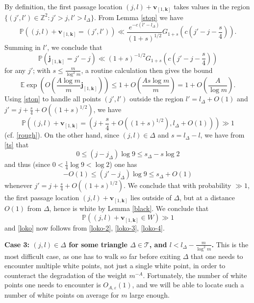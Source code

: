 \documentclass[12pt,a4paper,reqno]{amsart}
\numberwithin{equation}{section}
\theoremstyle{plain}
\theoremstyle{definition}
\renewcommand\P{\mathbb{P}}
\newcommand\E{\mathbb{E}}
\newcommand\Z{\mathbb{Z}}
\renewcommand\j{\mathbf{j}}
\renewcommand\k{\mathbf{k}}
\renewcommand\v{\mathbf{v}}
\newcommand\eps{\varepsilon}
\begin{document}
By definition, the first passage location $(j,l) + \v_{[1,\k]}$ takes values in the region $\{ (j',l') \in \Z^2: j' > j, l' > l_\Delta \}$.  From Lemma \ref{stop} we have
\begin{equation}\label{ston}
\P( (j,l) + \v_{[1,\k]} = (j',l') ) \ll \frac{e^{-c(l'-l_\Delta)}}{(1+s)^{1/2} } G_{1+s}\left(c(j'-j - \frac{s}{4}) \right).
\end{equation}
Summing in $l'$, we conclude that
$$\P( \j_{[1,\k]} = j'-j ) \ll (1+s)^{-1/2} G_{1+s}\left( c(j'-j - \frac{s}{4}) \right)$$
for any $j'$; with $s \leq \frac{m}{\log^2 m}$, a routine calculation then gives the bound
\begin{equation}\label{loko-3}
 \E \exp\left( O\left( \frac{A\log m}{m} \j_{[1,\k]} \right) \right) \leq 1 + O\left( \frac{As \log m}{m} \right) = 1 + O\left( \frac{A}{\log m} \right).
\end{equation}
Using \eqref{ston} to handle all points $(j',l')$ outside the region $l' = l_\Delta+O(1)$ and $j' = j + \frac{s}{4} + O( (1+s)^{1/2} )$, we have
\begin{equation}\label{hash}
 \P\left( (j,l) + \v_{[1,\k]} = \left(j+\frac{s}{4} + O((1+s)^{1/2}),l_\Delta + O(1)\right) \right) \gg 1
\end{equation}
(cf. \eqref{rough}).
On the other hand, since $(j,l) \in \Delta$ and $s = l_\Delta - l$, we have from \eqref{ts} that 
$$ 0 \leq (j-j_\Delta) \log 9 \leq s_\Delta - s \log 2$$
and thus (since $0 < \frac{1}{4} \log 9 < \log 2$) one has
$$ -O(1) \leq (j'-j_\Delta ) \log 9 \leq s_\Delta + O(1)$$
whenever $j' = j + \frac{s}{4} + O((1+s)^{1/2})$.  We conclude that with probability $\gg 1$, the first passage location $(j,l) + \v_{[1,\k]}$ lies outside of $\Delta$, but at a distance $O(1)$ from $\Delta$, hence is white by Lemma \ref{black}.  We conclude that
\begin{equation}\label{loko-4}
 \P( (j,l) + \v_{[1,\k]} \in W ) \gg 1
\end{equation}
and \eqref{loko} now follows from \eqref{loko-2}, \eqref{loko-3}, \eqref{loko-4}.



\textbf{Case 3: $(j,l) \in \Delta$ for some triangle $\Delta \in {\mathcal T}$, and $l < l_\Delta - \frac{m}{\log^2 m}$.}  This is the most difficult case, as one has to walk so far before exiting $\Delta$ that one needs to encounter multiple white points, not just a single white point, in order to counteract the degradation of the weight $m^{-A}$.  Fortunately, the number of white points one needs to encounter is $O_{A,\eps}(1)$, and we will be able to locate such a number of white points on average for $m$ large enough.
\end{document}
